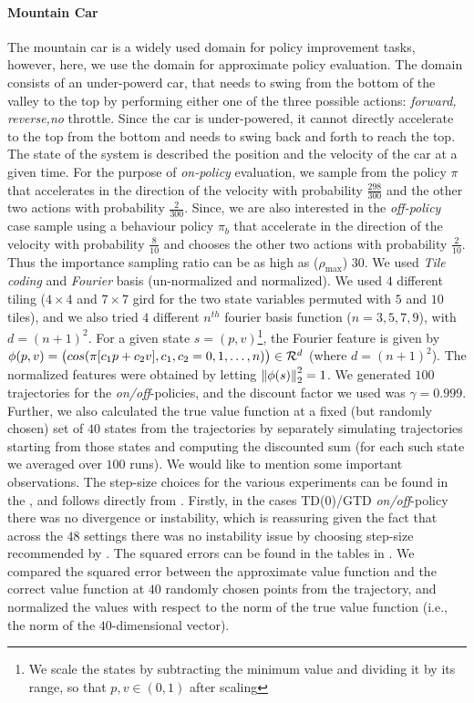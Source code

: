 \paragraph{Mountain Car}   
The mountain car is a widely used domain for policy improvement tasks, however, here, we use the domain for approximate policy evaluation. The domain consists of an under-powerd car, that needs to swing from the bottom of the valley to the top by performing either one of the three possible actions: \emph{forward, reverse,no} throttle. Since the car is under-powered, it cannot directly accelerate to the top from the bottom and needs to swing back and forth to reach the top. The state of the system is described the position and the velocity of the car at a given time. For the purpose of \emph{on-policy} evaluation, we sample from the policy $\pi$ that accelerates in the direction of the velocity with probability $\frac{298}{300}$ and the other two actions with probability $\frac{2}{300}$. Since, we are also interested in the \emph{off-policy} case sample using a behaviour policy  $\pi_b$ that accelerate in the direction of the velocity with probability $\frac{8}{10}$ and chooses the other two actions with probability $\frac{2}{10}$. Thus the importance sampling ratio can be as high as ($\rho_{\max}$) $30$. 
 We used \emph{Tile coding} and \emph{Fourier} basis (un-normalized and normalized). We used $4$ different tiling ($4\times 4$ and $7\times 7$ gird for the two state variables permuted with $5$ and $10$ tiles), and we also tried $4$ different $n^{th}$ fourier basis function ($n=3,5,7,9$), with $d=(n+1)^2$. For a given state $s=(p,v)$\footnote{We scale the states by subtracting the minimum value and dividing it by its range, so that $p,v\in(0,1)$ after scaling}, the Fourier feature is given by $\phi(p,v)=\big(cos(\pi [c_1p+c_2 v],c_1,c_2=0,1,\ldots,n)\big) \in \mathcal{R}^{d}$ (where $d=(n+1)^2$). The normalized features were obtained by letting $\left\| \phi(s)\right\|^2_2=1$. We generated $100$ trajectories for the \emph{on/off}-policies, and the discount factor we used was $\gamma=0.999$. Further, we also calculated the true value function at a fixed (but randomly chosen) set of $40$ states from the trajectories by separately simulating trajectories starting from those states and computing the discounted sum (for each such state we averaged over $100$ runs).
 We would like to mention some important observations. The step-size choices for the various experiments can be found in the , and follows directly from . Firstly, in the cases TD(0)/GTD \emph{on/off}-policy there was no divergence or instability, which is reassuring given the fact that across the $48$ settings there was no instability issue by choosing step-size recommended by . The squared errors can be found in the tables in . We compared the squared error between the approximate value function and the correct value function at $40$ randomly chosen points from the trajectory, and normalized the values with respect to the norm of the true value function (i.e., the norm of the $40$-dimensional vector). 
 
